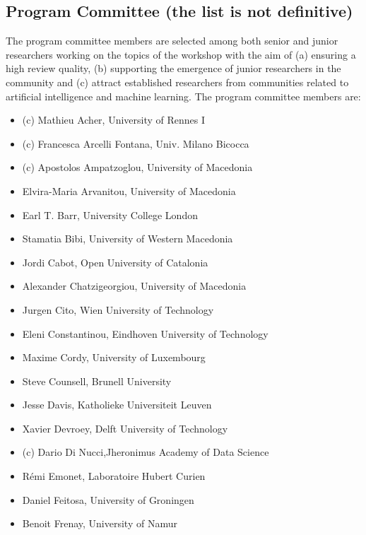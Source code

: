 \subsection{Program Committee (the list is not definitive)}
The program committee members are selected among both senior and junior researchers working on the topics of the workshop with the aim of (a) ensuring a high review quality, (b) supporting the emergence of junior researchers in the community and (c) attract established researchers from communities related to artificial intelligence and machine learning.
The program committee members are:
\begin{itemize}
	\item (c) Mathieu Acher, University of Rennes I \smallskip
	\item (c) Francesca Arcelli Fontana, Univ. Milano Bicocca \smallskip
	\item (c) Apostolos Ampatzoglou, University of Macedonia \smallskip
	\item Elvira-Maria Arvanitou, University of Macedonia \smallskip
	\item Earl T. Barr, University College London \smallskip
	\item Stamatia Bibi, University of Western Macedonia \smallskip
	\item Jordi Cabot, Open University of Catalonia \smallskip
	\item Alexander Chatzigeorgiou, University of Macedonia \smallskip
	\item Jurgen Cito, Wien University of Technology \smallskip
	\item Eleni Constantinou, Eindhoven University of Technology \smallskip
	\item Maxime Cordy, University of Luxembourg \smallskip
	\item Steve Counsell, Brunell University \smallskip
	\item Jesse Davis, Katholieke Universiteit Leuven \smallskip
	\item Xavier Devroey, Delft University of Technology \smallskip
	\item (c) Dario Di Nucci,Jheronimus Academy of Data Science \smallskip
	\item Rémi Emonet, Laboratoire Hubert Curien \smallskip
	\item Daniel Feitosa, University of Groningen \smallskip
	\item Benoit Frenay, University of Namur\smallskip 

\end{itemize}
